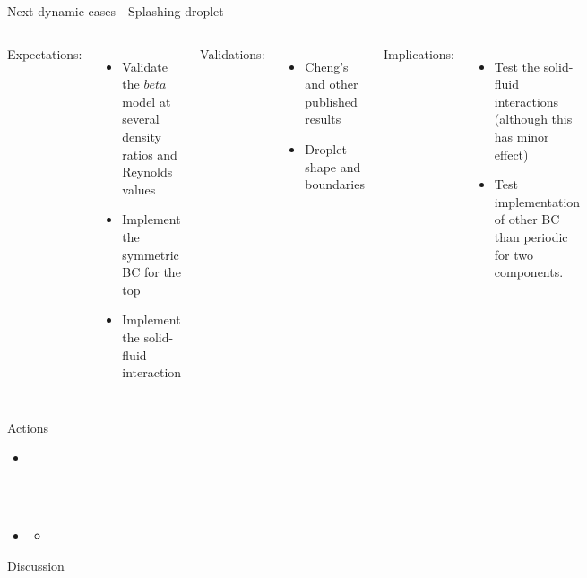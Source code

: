 \documentclass{beamer}
\begin{document}
	\begin{frame}{Next dynamic cases - Splashing droplet}
		
		\begin{columns}
			
			Expectations:
			\begin{itemize}
				\item Validate the $beta$ model at several density ratios and Reynolds values
				\item Implement the symmetric BC for the top
				\item Implement the solid-fluid interaction
			\end{itemize}
			
			Validations:
			\begin{itemize}
				\item Cheng's and other published results
				\item Droplet shape and boundaries
			\end{itemize}
			Implications:
			\begin{itemize}
				\item Test the solid-fluid interactions (although this has minor effect)
				\item Test implementation of other BC than periodic for two components.
			\end{itemize}
		\end{columns}
	\end{frame}
	
	
	\begin{frame}{Actions}
		\begin{itemize}
			\item
		\end{itemize}
	\end{frame}

	
	\begin{frame}{}
		\textbf{}\\~\\
		\begin{itemize}
			\item 
			\begin{itemize}
				\item 
			\end{itemize}
		\end{itemize}
	
	\end{frame}
	\begin{frame}{}
		
	\end{frame}
		\begin{frame}{Discussion}
		\begin{columns}
			
			\column{0.5\textwidth}
			
			
			\column{0.5\textwidth}
			
		\end{columns}
	\end{frame}
	
\end{document}
